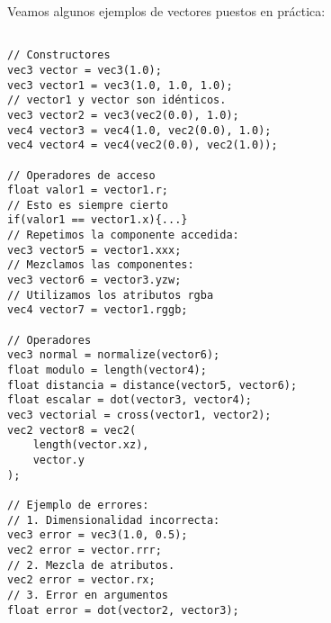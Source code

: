 Veamos algunos ejemplos de vectores puestos en práctica:

\begin{lstlisting}

// Constructores
vec3 vector = vec3(1.0);
vec3 vector1 = vec3(1.0, 1.0, 1.0);
// vector1 y vector son idénticos.
vec3 vector2 = vec3(vec2(0.0), 1.0);
vec4 vector3 = vec4(1.0, vec2(0.0), 1.0);
vec4 vector4 = vec4(vec2(0.0), vec2(1.0));

// Operadores de acceso
float valor1 = vector1.r;
// Esto es siempre cierto
if(valor1 == vector1.x){...}
// Repetimos la componente accedida:
vec3 vector5 = vector1.xxx;
// Mezclamos las componentes:
vec3 vector6 = vector3.yzw;
// Utilizamos los atributos rgba
vec4 vector7 = vector1.rggb;

// Operadores
vec3 normal = normalize(vector6);
float modulo = length(vector4);
float distancia = distance(vector5, vector6);
float escalar = dot(vector3, vector4);
vec3 vectorial = cross(vector1, vector2);
vec2 vector8 = vec2(
    length(vector.xz), 
    vector.y
);

// Ejemplo de errores:
// 1. Dimensionalidad incorrecta:
vec3 error = vec3(1.0, 0.5);
vec2 error = vector.rrr;
// 2. Mezcla de atributos.
vec2 error = vector.rx;
// 3. Error en argumentos
float error = dot(vector2, vector3);

\end{lstlisting}

